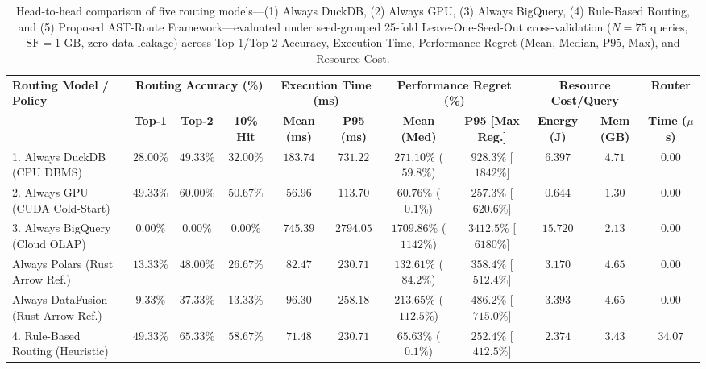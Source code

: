 \documentclass[10pt,a4paper]{article}
\begin{document}
\begin{table}[!t]
\centering
\caption{Head-to-head comparison of five routing models---(1) Always DuckDB, (2) Always GPU, (3) Always BigQuery, (4) Rule-Based Routing, and (5) Proposed AST-Route Framework---evaluated under seed-grouped 25-fold Leave-One-Seed-Out cross-validation ($N=75$ queries, $\text{SF}=1\text{ GB}$, zero data leakage) across Top-1/Top-2 Accuracy, Execution Time, Performance Regret (Mean, Median, P95, Max), and Resource Cost.}
\label{tab:routing_evaluation}\label{tab:query_routing}\label{tab:router_eval}
\scriptsize
\setlength{\tabcolsep}{3.2pt}
\renewcommand{\arraystretch}{1.12}
\begin{tabular}{@{}lcccccccccc@{}}
\toprule
\multirow{2}{*}{\textbf{Routing Model / Policy}} & \multicolumn{3}{c}{\textbf{Routing Accuracy (\%)}} & \multicolumn{2}{c}{\textbf{Execution Time (ms)}} & \multicolumn{2}{c}{\textbf{Performance Regret (\%)}} & \multicolumn{2}{c}{\textbf{Resource Cost/Query}} & \textbf{Router} \\
\cmidrule(lr){2-4} \cmidrule(lr){5-6} \cmidrule(lr){7-8} \cmidrule(lr){9-10} \cmidrule(lr){11-11}
 & \textbf{Top-1} & \textbf{Top-2} & \textbf{10\% Hit} & \textbf{Mean (ms)} & \textbf{P95 (ms)} & \textbf{Mean (Med)} & \textbf{P95 [Max Reg.]} & \textbf{Energy (J)} & \textbf{Mem (GB)} & \textbf{Time ($\mu$s)} \\
\midrule
1. Always DuckDB (CPU DBMS) & $28.00\%$ & $49.33\%$ & $32.00\%$ & $183.74$ & $731.22$ & $271.10\%$ ($59.8\%$) & $928.3\%$ [$1842\%$] & $6.397$ & $4.71$ & $0.00$ \\
2. Always GPU (CUDA Cold-Start) & $49.33\%$ & $60.00\%$ & $50.67\%$ & $56.96$ & $113.70$ & $60.76\%$ ($0.1\%$) & $257.3\%$ [$620.6\%$] & $0.644$ & $1.30$ & $0.00$ \\
3. Always BigQuery (Cloud OLAP) & $0.00\%$ & $0.00\%$ & $0.00\%$ & $745.39$ & $2794.05$ & $1709.86\%$ ($1142\%$) & $3412.5\%$ [$6180\%$] & $15.720$ & $2.13$ & $0.00$ \\
Always Polars (Rust Arrow Ref.) & $13.33\%$ & $48.00\%$ & $26.67\%$ & $82.47$ & $230.71$ & $132.61\%$ ($84.2\%$) & $358.4\%$ [$512.4\%$] & $3.170$ & $4.65$ & $0.00$ \\
Always DataFusion (Rust Arrow Ref.) & $9.33\%$ & $37.33\%$ & $13.33\%$ & $96.30$ & $258.18$ & $213.65\%$ ($112.5\%$) & $486.2\%$ [$715.0\%$] & $3.393$ & $4.65$ & $0.00$ \\
4. Rule-Based Routing (Heuristic) & $49.33\%$ & $65.33\%$ & $58.67\%$ & $71.48$ & $230.71$ & $65.63\%$ ($0.1\%$) & $252.4\%$ [$412.5\%$] & $2.374$ & $3.43$ & $34.07$ \\

\end{tabular}
\end{table}
\end{document}
